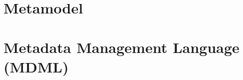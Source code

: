 \documentclass[runningheads]{llncs}
\begin{document}
%
%
%
%



	
	\section{Metamodel}
	\section{Metadata Management Language (MDML)}
\end{document}
